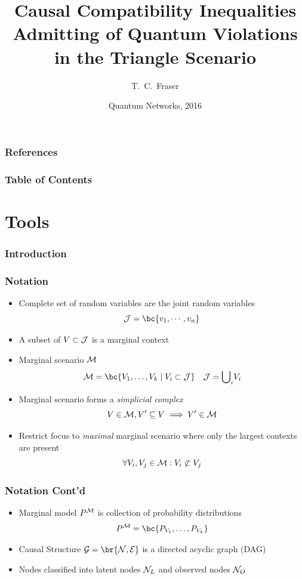 \documentclass[
    hyperref={colorlinks=true, linkcolor=blue, urlcolor=blue, citecolor=MidnightBlue},
    xcolor={dvipsnames},
]{beamer}
\title[Triangle Inequalities]{Causal Compatibility Inequalities Admitting of Quantum Violations in the Triangle Scenario}
\author[Fraser]{T.~C.~Fraser\inst{1}}
\institute[PI]
{
    \inst{1}%
    Perimeter Institute for Theoretical Physics\\
    Ontario, Canada
}
\date[QN 2016]{Quantum Networks, 2016}
\renewcommand{\term}[1]{\textcolor{Mahogany}{#1}}
\begin{document}
\frame{\titlepage}


\begin{frame}[allowframebreaks]
    \frametitle{References}
    
    {}
\end{frame}

\begin{frame}
    \frametitle{Table of Contents}
\tableofcontents

\end{frame}

\section{Tools}

\begin{frame}
    \frametitle{Introduction}
    \note[item]{\todo[TC]{}}
\end{frame}

\begin{frame}
    \frametitle{Notation}
    \begin{itemize}
        \item Complete set of random variables are the \term{joint random variables}
        \[ \jointvar = \bc{v_1, \cdots, v_n} \]
        \item A subset of $V \subset \mathcal{J}$ is a \term{marginal context}
        \item \term{Marginal scenario} $\mathcal{M}$
        \[ \mscenario = \bc{V_1, \ldots, V_k \mid V_i \subset \jointvar} \quad \jointvar = {\bigcup}_{i} V_i  \]
        \item Marginal scenario forms a \textit{simplicial complex}
        \[ V \in \mathcal{M}, V' \subseteq V  \implies V' \in \mathcal{M} \]
        \item Restrict focus to \textit{maximal} marginal scenario where only the largest contexts are present
        \[ \forall V_i, V_j \in \mathcal{M} : V_i \not \subset V_j \]
    \end{itemize}
\end{frame}

\begin{frame}
    \frametitle{Notation Cont'd}
    \begin{itemize}
        \item \term{Marginal model} $\prob^{\mscenario}$ is collection of probability distributions
        \[ \prob^{\mscenario} = \bc{\prob[V_1], \ldots, \prob[V_k]} \]
        \item \term{Causal Structure} $\graph = \br{\nodes, \edges}$ is a directed acyclic graph (DAG)
        \item Nodes classified into \term{latent nodes} $\mathcal{N}_{L}$ and \term{observed nodes} $\mathcal{N}_{O}$
    \end{itemize}
\end{frame}
\end{document}
